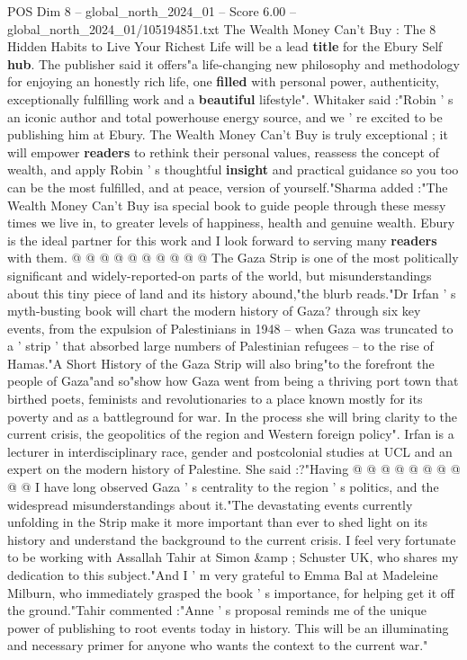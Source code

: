 \begin{textsample}{POS Dim 8 – global\_north\_2024\_01 – Score 6.00 – global\_north\_2024\_01/105194851.txt}  \label{ex:f8_pos_232}
The Wealth Money Can't Buy : The 8 Hidden Habits to Live Your Richest Life will be a lead \textbf{title} for the Ebury Self \textbf{hub}.
The publisher said it offers"a life-changing new philosophy and methodology for enjoying an honestly rich life, one \textbf{filled} with personal power, authenticity, exceptionally fulfilling work and a \textbf{beautiful} lifestyle".
Whitaker said :"Robin ' s an iconic author and total powerhouse energy source, and we ' re excited to be publishing him at Ebury.
The Wealth Money Can't Buy is truly exceptional ; it will empower \textbf{readers} to rethink their personal values, reassess the concept of wealth, and apply Robin ' s thoughtful \textbf{insight} and practical guidance so you too can be the most fulfilled, and at peace, version of yourself."Sharma added :"The Wealth Money Can't Buy isa special book to guide people through these messy times we live in, to greater levels of happiness, health and genuine wealth.
Ebury is the ideal partner for this work and I look forward to serving many \textbf{readers} with them. @ @ @ @ @ @ @ @ @ @ The Gaza Strip is one of the most politically significant and widely-reported-on parts of the world, but misunderstandings about this tiny piece of land and its history abound,"the blurb reads."Dr Irfan ' s myth-busting book will chart the modern history of Gaza? through six key events, from the expulsion of Palestinians in 1948 -- when Gaza was truncated to a ' strip ' that absorbed large numbers of Palestinian refugees -- to the rise of Hamas."A Short History of the Gaza Strip will also bring"to the forefront the people of Gaza"and so"show how Gaza went from being a thriving port town that birthed poets, feminists and revolutionaries to a place known mostly for its poverty and as a battleground for war.
In the process she will bring clarity to the current crisis, the geopolitics of the region and Western foreign policy".
Irfan is a lecturer in interdisciplinary race, gender and postcolonial studies at UCL and an expert on the modern history of Palestine.
She said :?"Having @ @ @ @ @ @ @ @ @ @ I have long observed Gaza ' s centrality to the region ' s politics, and the widespread misunderstandings about it."The devastating events currently unfolding in the Strip make it more important than ever to shed light on its history and understand the background to the current crisis.
I feel very fortunate to be working with Assallah Tahir at Simon \&amp ; Schuster UK, who shares my dedication to this subject."And I ' m very grateful to Emma Bal at Madeleine Milburn, who immediately grasped the book ' s importance, for helping get it off the ground."Tahir commented :"Anne ' s proposal reminds me of the unique power of publishing to root events today in history.
This will be an illuminating and necessary primer for anyone who wants the context to the current war."

\end{textsample}
